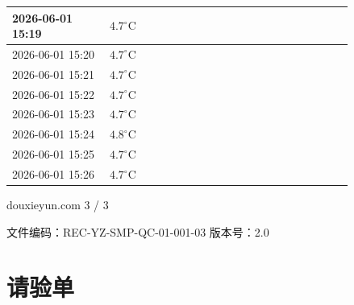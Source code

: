 \documentclass[UTF8,10pt,a4paper,fontset=fandol]{ctexart}
\newcommand{\fieldvalue}[1]{#1}
\begin{document}
\begin{tabular}{|p{0.24\linewidth}|p{0.18\linewidth}|p{0.24\linewidth}|p{0.18\linewidth}|}
\fieldvalue{2026-06-01 15:19} &
\fieldvalue{$4.7^\circ\mathrm{C}$} & & \\ \hline
\fieldvalue{2026-06-01 15:20} &
\fieldvalue{$4.7^\circ\mathrm{C}$} & & \\ \hline
\fieldvalue{2026-06-01 15:21} &
\fieldvalue{$4.7^\circ\mathrm{C}$} & & \\ \hline
\fieldvalue{2026-06-01 15:22} &
\fieldvalue{$4.7^\circ\mathrm{C}$} & & \\ \hline
\fieldvalue{2026-06-01 15:23} &
\fieldvalue{$4.7^\circ\mathrm{C}$} & & \\ \hline
\fieldvalue{2026-06-01 15:24} &
\fieldvalue{$4.8^\circ\mathrm{C}$} & & \\ \hline
\fieldvalue{2026-06-01 15:25} &
\fieldvalue{$4.7^\circ\mathrm{C}$} & & \\ \hline
\fieldvalue{2026-06-01 15:26} &
\fieldvalue{$4.7^\circ\mathrm{C}$} & & \\ \hline
\end{tabular}

\vfill

\noindent\footnotesize douxieyun.com \hfill 3 / 3

\newpage

\begin{center}
文件编码：REC-YZ-SMP-QC-01-001-03 \qquad 版本号：2.0

\section*{请验单}
\end{center}
\end{document}

